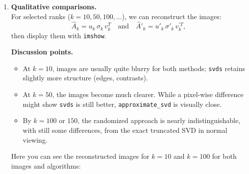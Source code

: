 \documentclass[11pt,a4paper, margin=1in]{article}
\begin{document}
\begin{enumerate}
    \item \textbf{Qualitative comparisons.} \\
    For selected ranks ($k=10, 50, 100, ...$), we can reconstruct
    the images:
    \[
      \hat{A}_{k} = u_{k}\,\sigma_{k}\,v_{k}^{T}
      \quad \text{and} \quad
      \hat{A}'_{k} = u'_{k}\,\sigma'_{k}\,v_{k}^{'T},
    \]
    then display them with \texttt{imshow}. 

    \textbf{Discussion points.}
    \begin{itemize}
      \item At $k=10$, images are usually quite blurry for both methods; 
      \texttt{svds} retains slightly more structure (edges, contrasts).
      
      \item At $k=50$, the images become much clearer. While a pixel-wise difference might show 
      \texttt{svds} is still better, \texttt{approximate\_svd} is visually close.
      
      \item By $k=100$ or $150$, the randomized approach is nearly indistinguishable, with still some differences, 
      from the exact truncated SVD in normal viewing.
    \end{itemize}

    Here you can see the reconstructed images for \(k=10\) and \(k=100\) for both images and algorithms:
    

\end{enumerate}
\end{document}
